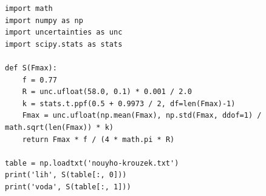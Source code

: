 \documentclass[a4paper,11pt]{article}
\begin{document}
\begin{lstlisting}[caption={Měření povrchového napětí du Noüyho metodou}]
import math
import numpy as np
import uncertainties as unc
import scipy.stats as stats

def S(Fmax):
    f = 0.77
    R = unc.ufloat(58.0, 0.1) * 0.001 / 2.0
    k = stats.t.ppf(0.5 + 0.9973 / 2, df=len(Fmax)-1)
    Fmax = unc.ufloat(np.mean(Fmax), np.std(Fmax, ddof=1) / math.sqrt(len(Fmax)) * k)
    return Fmax * f / (4 * math.pi * R)

table = np.loadtxt('nouyho-krouzek.txt')
print('lih', S(table[:, 0]))
print('voda', S(table[:, 1]))
\end{lstlisting}
\end{document}
